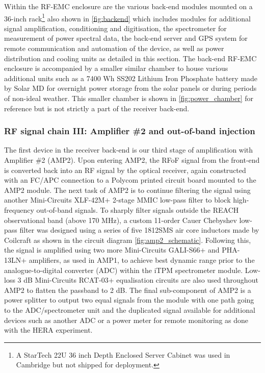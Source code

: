 Within the RF-EMC enclosure are the various back-end modules mounted on a 36-inch rack\footnote{A StarTech 22U 36 inch Depth Enclosed Server Cabinet was used in Cambridge but not shipped for deployment.} also shown in \cref{fig:backend} which includes modules for additional signal amplification, conditioning and digitisation, the spectrometer for measurement of power spectral data, the back-end server and GPS system for remote communication and automation of the device, as well as power distribution and cooling units as detailed in this section. The back-end RF-EMC enclosure is accompanied by a smaller similar chamber to house various additional units such as a 7400 Wh SS202 Lithium Iron Phosphate battery made by Solar MD for overnight power storage from the solar panels or during periods of non-ideal weather. This smaller chamber is shown in \cref{fig:power_chamber} for reference but is not strictly a part of the receiver back-end.


\subsubsection{RF signal chain III: Amplifier \#2 and out-of-band injection}
The first device in the receiver back-end is our third stage of amplification with Amplifier \#2 (AMP2). Upon entering AMP2, the RFoF signal from the front-end is converted back into an RF signal by the optical receiver, again constructed with an FC/APC connection to a Polycom printed circuit board mounted to the AMP2 module. The next task of AMP2 is to continue filtering the signal using another Mini-Circuits XLF-42M+ 2-stage MMIC low-pass filter to block high-frequency out-of-band signals. To sharply filter signals outside the REACH observational band (above 170 MHz), a custom 11-order Cauer Chebyshev low-pass filter was designed using a series of five 1812SMS air core inductors made by Coilcraft as shown in the circuit diagram \cref{fig:amp2_schematic}. Following this, the signal is amplified using two more Mini-Circuits GALI-S66+ and PHA-13LN+ amplifiers, as used in AMP1, to achieve best dynamic range prior to the analogue-to-digital converter (ADC) within the iTPM spectrometer module. Low-loss 3 dB Mini-Circuits RCAT-03+ equalisation circuits are also used throughout AMP2 to flatten the passband to 2 dB. The final sub-component of AMP2 is a power splitter to output two equal signals from the module with one path going to the ADC/spectrometer unit and the duplicated signal available for additional devices such as another ADC or a power meter for remote monitoring as done with the HERA experiment.

